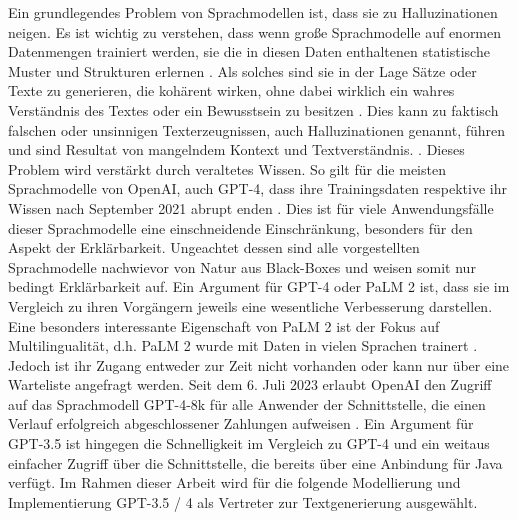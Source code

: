 Ein grundlegendes Problem von Sprachmodellen ist, dass sie zu Halluzinationen neigen.
Es ist wichtig zu verstehen, dass wenn große Sprachmodelle auf enormen Datenmengen trainiert werden, sie die in diesen Daten enthaltenen statistische Muster und Strukturen erlernen \cite{basel-ml-arch}.
Als solches sind sie in der Lage Sätze oder Texte zu generieren, die kohärent wirken, ohne dabei wirklich ein wahres Verständnis des Textes oder ein Bewusstsein zu besitzen \cite{basel-ml-arch}.
Dies kann zu faktisch falschen oder unsinnigen Texterzeugnissen, auch Halluzinationen genannt, führen und sind Resultat von mangelndem Kontext und Textverständnis. \cite{sabre-pc-ai-hallucinations}.
Dieses Problem wird verstärkt durch veraltetes Wissen. 
So gilt für die meisten Sprachmodelle von OpenAI, auch GPT-4, dass ihre Trainingsdaten respektive ihr Wissen nach September 2021 abrupt enden \cite{openai-gpt-sep-2021}.
Dies ist für viele Anwendungsfälle dieser Sprachmodelle eine einschneidende Einschränkung, besonders für den Aspekt der Erklärbarkeit.
Ungeachtet dessen sind alle vorgestellten Sprachmodelle nachwievor von Natur aus Black-Boxes und weisen somit nur bedingt Erklärbarkeit auf.
Ein Argument für GPT-4 oder PaLM 2 ist, dass sie im Vergleich zu ihren Vorgängern jeweils eine wesentliche Verbesserung darstellen.
Eine besonders interessante Eigenschaft von PaLM 2 ist der Fokus auf Multilingualität, d.h. PaLM 2 wurde mit Daten in vielen Sprachen trainert \cite{google-palm2-techreport}.
Jedoch ist ihr Zugang entweder zur Zeit nicht vorhanden oder kann nur über eine Warteliste angefragt werden.
Seit dem 6. Juli 2023 erlaubt OpenAI den Zugriff auf das Sprachmodell GPT-4-8k für alle Anwender der Schnittstelle, die einen Verlauf erfolgreich abgeschlossener Zahlungen aufweisen \cite{openai-gpt4-access}.
Ein Argument für GPT-3.5 ist hingegen die Schnelligkeit im Vergleich zu GPT-4 und ein weitaus einfacher Zugriff über die Schnittstelle, die bereits über eine Anbindung für Java verfügt.
Im Rahmen dieser Arbeit wird für die folgende Modellierung und Implementierung GPT-3.5 / 4 als Vertreter zur Textgenerierung ausgewählt.

